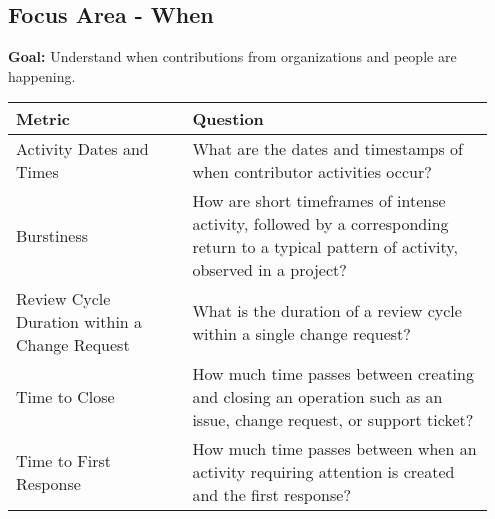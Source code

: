 
\subsection{Focus Area - When}
\textbf{Goal:} Understand when contributions from organizations and people are happening.
\begin{table}[ht!]
    \centering
    \begin{tabular}{|p{0.35\linewidth} | p{0.6\linewidth}|}
        \hline
        \hfil \textbf{Metric}  & \hfil \textbf{Question} \\
        \hline
		Activity Dates and Times & What are the dates and timestamps of when contributor activities occur? \\ 
		\hline
		Burstiness & How are short timeframes of intense activity, followed by a corresponding return to a typical pattern of activity, observed in a project? \\ 
		\hline
		Review Cycle Duration within a Change Request & What is the duration of a review cycle within a single change request? \\ 
		\hline
		Time to Close & How much time passes between creating and closing an operation such as an issue, change request, or support ticket? \\ 
		\hline
		Time to First Response & How much time passes between when an activity requiring attention is created and the first response? \\ 
		\hline
    \end{tabular}
\end{table}

 
 
 
 
 
